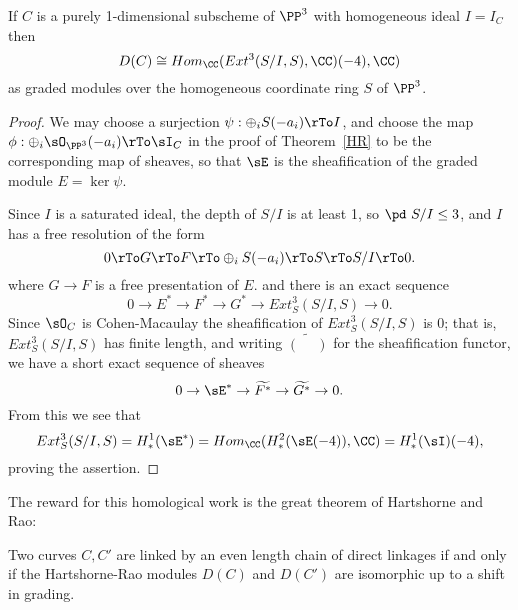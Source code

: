 \begin{corollary}
If $C$ is a purely 1-dimensional subscheme of $\PP^3$ with homogeneous ideal $I = I_C$ then 
$$
D(C) \cong Hom_\CC (Ext^3(S/I, S), \CC)(-4), \CC)
$$
as graded modules over the homogeneous coordinate ring $S$ of $\PP^3$.
\end{corollary}

\begin{proof}
We may choose a surjection  $\psi:  \oplus_iS(-a_i)\rTo I$, and choose the map
$\phi: \oplus_i\sO_{\PP^3}(-a_i)\rTo\sI_C$
in the proof of Theorem~\ref{HR}
to be the corresponding map of sheaves, so that
$\sE$ is the sheafification of the graded module $E = \ker \psi$.

Since $I$ is a saturated ideal,
 the depth of $S/I$ is at least 1, so $\pd\ S/I\leq 3$, and $I$ has a free resolution of the form
$$
0\rTo G \rTo F \rTo \oplus_iS(-a_i)  \rTo S\rTo S/I \rTo 0.
$$
where $G\to F$ is a free presentation of $E$. and there is an exact sequence
$$
0 \to E^* \to F^* \to G^* \to Ext^3_S(S/I, S) \to 0.
$$
Since $\sO_C$ is Cohen-Macaulay the sheafification of $Ext^3_S(S/I, S)$ is 0; that is,
$Ext^3_S(S/I, S)$ has finite length, and writing $\widetilde{(\phantom{-})}$ for the sheafification functor,
we have a short exact sequence of sheaves 
$$
0\to \sE^* \to \widetilde{F^*} \to \widetilde{G^*}\to 0.
$$
From this we see that 
$$
Ext^3_S(S/I,S) = H^1_*(\sE^*) = Hom_\CC( H^2_*(\sE(-4)),\CC) = H^1_*(\sI)(-4),
$$
proving the assertion.
\end{proof}

The reward for this homological work is the great theorem of Hartshorne and Rao:
\begin{theorem}
Two curves $C,C'$ are linked by an even length chain of direct linkages if and only if 
the Hartshorne-Rao modules $D(C)$ and $D(C')$ are isomorphic up to a shift in grading.
\end{theorem}

